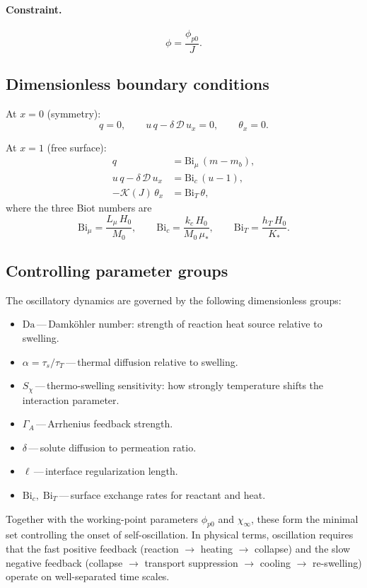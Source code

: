 \documentclass[aps,pre,reprint,superscriptaddress,longbibliography,floatfix]{revtex4-2}
\newcommand{\Ds}{\mathcal{D}}
\newcommand{\Ks}{\mathcal{K}}
\newcommand{\Da}{\mathrm{Da}}
\newcommand{\Bi}{\mathrm{Bi}}
\newcommand{\pp}{\phi_{p0}}
\begin{document}
\paragraph{Constraint.}
\begin{equation}
  \phi = \frac{\pp}{J}.
\end{equation}

\subsection{Dimensionless boundary conditions}

At $x=0$ (symmetry):
\begin{equation}
  q = 0, \qquad
  u\,q - \delta\,\Ds\,u_x = 0, \qquad
  \theta_x = 0.
  \label{eq:bc0_nondim}
\end{equation}

At $x=1$ (free surface):
\begin{align}
  q &= \Bi_\mu\,(m - m_b), \label{eq:bc1_mu} \\
  u\,q - \delta\,\Ds\,u_x &= \Bi_c\,(u - 1), \label{eq:bc1_c} \\
  -\Ks(J)\,\theta_x &= \Bi_T\,\theta, \label{eq:bc1_T}
\end{align}
where the three Biot numbers are
\begin{equation}
  \Bi_\mu = \frac{L_\mu\,H_0}{M_0},
  \qquad
  \Bi_c = \frac{k_c\,H_0}{M_0\,\mu_*},
  \qquad
  \Bi_T = \frac{h_T\,H_0}{K_*}.
  \label{eq:Bi}
\end{equation}

\subsection{Controlling parameter groups}

The oscillatory dynamics are governed by the following dimensionless groups:
\begin{itemize}
  \item $\Da$\,---\,Damk\"ohler number: strength of reaction heat source relative to swelling.
  \item $\alpha = \tau_s/\tau_T$\,---\,thermal diffusion relative to swelling.
  \item $S_\chi$\,---\,thermo-swelling sensitivity: how strongly temperature shifts the interaction parameter.
  \item $\Gamma_A$\,---\,Arrhenius feedback strength.
  \item $\delta$\,---\,solute diffusion to permeation ratio.
  \item $\ell$\,---\,interface regularization length.
  \item $\Bi_c,\;\Bi_T$\,---\,surface exchange rates for reactant and heat.
\end{itemize}
Together with the working-point parameters $\pp$ and $\chi_\infty$, these form the minimal set controlling the onset of self-oscillation. In physical terms, oscillation requires that the fast positive feedback (reaction $\to$ heating $\to$ collapse) and the slow negative feedback (collapse $\to$ transport suppression $\to$ cooling $\to$ re-swelling) operate on well-separated time scales.
\end{document}
